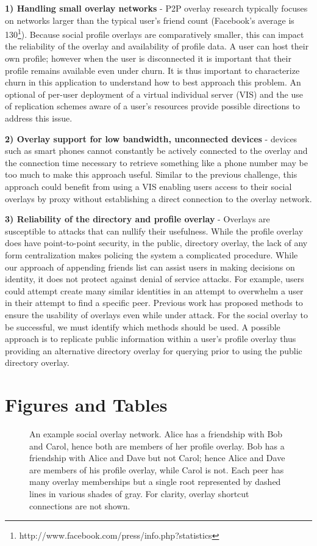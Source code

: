 {\bf 1) Handling small overlay networks} - P2P overlay research typically focuses on
networks larger than the typical user's friend count (Facebook's average is
130\footnote{http://www.facebook.com/press/info.php?statistics}).  Because social profile overlays are comparatively smaller, this can
impact the reliability of the overlay and availability of profile data.  A user
can host their own profile; however when the user is disconnected it is important
that their profile remains available even under churn. It is thus important to
characterize churn in this application to understand how to best approach this
problem. An optional of per-user deployment of a virtual individual server (VIS)
and the use of replication schemes aware of a user's resources provide possible
directions to address this issue.

{\bf 2) Overlay support for low bandwidth, unconnected devices} - devices such as
smart phones cannot constantly be actively connected to the overlay and the
connection time necessary to retrieve something like a phone number may be
too much to make this approach useful.  Similar to the previous challenge,
this approach could benefit from using a VIS enabling users access to their
social overlays by proxy without establishing a direct connection to the overlay
network.

{\bf 3) Reliability of the directory and profile overlay} - Overlays are
susceptible to attacks that can nullify their usefulness.  While
the profile overlay does have point-to-point security, in the public,
directory overlay, the lack of any form centralization makes policing the system
a complicated procedure.  While our approach of appending friends list can assist
users in making decisions on identity, it does not protect against denial of
service attacks.  For example, users could attempt create many similar identities
in an attempt to overwhelm a user in their attempt to find a specific peer.
Previous work has proposed methods to ensure the usability of overlays even
while under attack.  For the social overlay to be successful, we must identify
which methods should be used. A possible approach is to replicate public
information within a user's profile overlay thus providing an alternative
directory overlay for querying prior to using the public directory overlay.

\section{Figures and Tables}

\begin{figure}[ht]
\centering
{}
\caption{An example social overlay network.  Alice has a friendship with Bob and
Carol, hence both are members of her profile overlay. Bob has a
friendship with Alice and Dave but not Carol; hence Alice and Dave are members of
his profile overlay, while Carol is not.  Each peer has many overlay memberships
but a single root represented by dashed lines in various shades of gray.
For clarity, overlay shortcut connections are not shown.}
\label{fig:system}
\end{figure}


